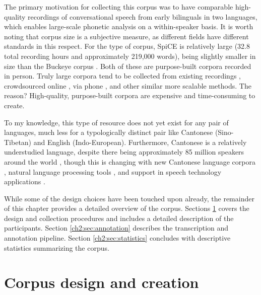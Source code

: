 The primary motivation for collecting this corpus was to have comparable high-quality recordings of conversational speech from early bilinguals in two languages, which enables large-scale phonetic analysis on a within-speaker basis. It is worth noting that corpus size is a subjective measure, as different fields have different standards in this respect. For the type of corpus, SpiCE is relatively large (32.8 total recording hours and approximately 219,000 words), being slightly smaller in size than the Buckeye corpus \citep[approximately 40 total recording hours and 307,000 words][]{pitt_2005_buckeye}. Both of these are purpose-built corpora recorded in person. Truly large corpora tend to be collected from existing recordings \citep[radio, YouTube, audiobooks, etc.; e.g., Librispeech, 1000 hours:][]{panayotov_librispeech_2015}, crowdsourced online \citep[e.g. Mozilla Common Voice, 2500 hours:][]{ardila_2020_common}, via phone \citep[e.g., SWITCHBOARD, 260 hours:][]{godfrey_switchboard_1992}, and other similar more scalable methods. The reason? High-quality, purpose-built corpora are expensive and time-consuming to create.

To my knowledge, this type of resource does not yet exist for any pair of languages, much less for a typologically distinct pair like Cantonese (Sino-Tibetan) and English (Indo-European). Furthermore, Cantonese is a relatively understudied language, despite there being approximately 85 million speakers around the world \citep{ethnologue_yue_2021}, though this is changing with new Cantonese language corpora \citep{luke_2015_hkc, leung_2001_hkcac, winterstein_2020_cantomap, alderete_2019_tone}, natural language processing tools \citep{lee_2018_pycantonese,yau_2019_pyjyutping}, and support in speech technology applications \citep{google_2019_stt}.

While some of the design choices have been touched upon already, the remainder of this chapter provides a detailed overview of the corpus. Sections \ref{ch2:sec:design} covers the design and collection procedures and includes a detailed description of the participants. Section \ref{ch2:sec:annotation} describes the transcription and annotation pipeline. Section \ref{ch2:sec:statistics} concludes with descriptive statistics summarizing the corpus. 

\section{Corpus design and creation}\label{ch2:sec:design}

